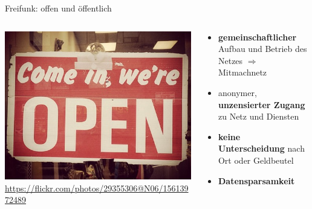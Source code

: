 \documentclass[10pt]{beamer}
\begin{document}
    \begin{frame}{Freifunk: offen und öffentlich}
    \begin{columns}[c]
      \begin{column}{5cm}
        \includegraphics[width=\textwidth]{images/open}
        \newline \tiny \url{https://flickr.com/photos/29355306@N06/15613972489}
      \end{column}
      \begin{column}{7cm}
        \begin{itemize}
          \item \textbf{gemeinschaftlicher} Aufbau und Betrieb des Netzes $\Rightarrow$ Mitmachnetz
          \item anonymer, \textbf{unzensierter Zugang} zu Netz und Diensten
          \item \textbf{keine Unterscheidung} nach Ort oder Geldbeutel
          \item \textbf{Datensparsamkeit}
        \end{itemize}
      \end{column}
    \end{columns}
  \end{frame}
\end{document}
